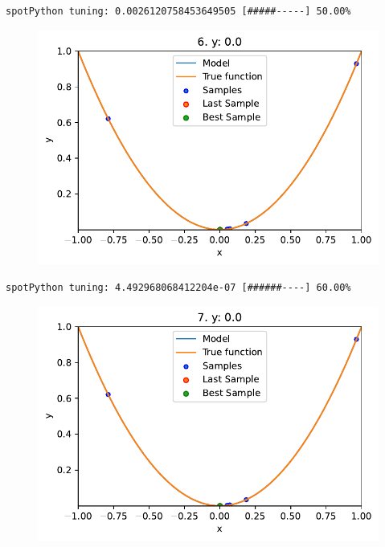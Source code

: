 \documentclass[
  letterpaper,
  DIV=11,
  numbers=noendperiod]{scrreprt}
\begin{document}
\begin{verbatim}
spotPython tuning: 0.0026120758453649505 [#####-----] 50.00% 
\end{verbatim}

\begin{figure}[H]

{\centering \includegraphics{04_spot_sklearn_surrogate_files/figure-pdf/cell-25-output-6.pdf}

}

\end{figure}

\begin{verbatim}
spotPython tuning: 4.492968068412204e-07 [######----] 60.00% 
\end{verbatim}

\begin{figure}[H]

{\centering \includegraphics{04_spot_sklearn_surrogate_files/figure-pdf/cell-25-output-8.pdf}

}

\end{figure}
\end{document}
